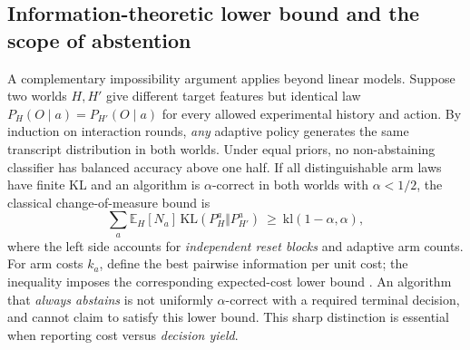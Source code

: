 \documentclass[11pt,a4paper]{article}
\newcommand{\E}{\mathbb{E}}\newcommand{\Prb}{\mathbb{P}}
\newcommand{\KL}{\mathrm{KL}}\newcommand{\TV}{\mathrm{TV}}
\theoremstyle{definition}\newtheorem{definition}[theorem]{Definition}
\theoremstyle{remark}\newtheorem{remark}[theorem]{Remark}
\begin{document}
\subsection{Information-theoretic lower bound and the scope of abstention}
A complementary impossibility argument applies beyond linear models. Suppose two worlds $H,H'$ give different target features but identical law $P_H(O\mid a)=P_{H'}(O\mid a)$ for every allowed experimental history and action. By induction on interaction rounds, \emph{any} adaptive policy generates the same transcript distribution in both worlds. Under equal priors, no non-abstaining classifier has balanced accuracy above one half. If all distinguishable arm laws have finite KL and an algorithm is $\alpha$-correct in both worlds with $\alpha<1/2$, the classical change-of-measure bound is
\begin{equation}\label{eq:klcost}
 \sum_a\E_H[N_a]\,\KL(P_H^a\Vert P_{H'}^a)\ \ge\ \mathrm{kl}(1-\alpha,\alpha),
\end{equation}
where the left side accounts for \emph{independent reset blocks} and adaptive arm counts. For arm costs $k_a$, define the best pairwise information per unit cost; the inequality imposes the corresponding expected-cost lower bound \citep{garivier,degenne}. An algorithm that \emph{always abstains} is not uniformly $\alpha$-correct with a required terminal decision, and cannot claim to satisfy this lower bound. This sharp distinction is essential when reporting cost versus \emph{decision yield}.
\end{document}
